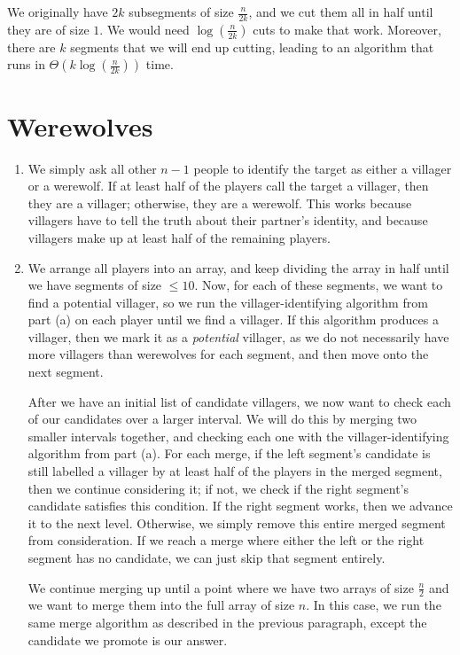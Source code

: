 \documentclass{article}
\begin{document}
We originally have $2k$ subsegments of size $\frac{n}{2k}$, and we cut them all in half until they are of size $1$. We would need $\log \left(\frac{n}{2k}\right)$ cuts to make that work. Moreover, there are $k$ segments that we will end up cutting, leading to an algorithm that runs in $\Theta\left(k \log \left(\frac{n}{2k}\right)\right)$ time.

\newpage
\section{Werewolves}
\begin{enumerate}[label=\alph*)]
	\item We simply ask all other $n-1$ people to identify the target as either a villager or a werewolf. If at least half of the players call the target a villager, then they are a villager; otherwise, they are a werewolf. This works because villagers have to tell the truth about their partner's identity, and because villagers make up at least half of the remaining players.
	\item We arrange all players into an array, and keep dividing the array in half until we have segments of size $\leq 10$. Now, for each of these segments, we want to find a potential villager, so we run the villager-identifying algorithm from part (a) on each player until we find a villager. If this algorithm produces a villager, then we mark it as a \textit{potential} villager, as we do not necessarily have more villagers than werewolves for each segment, and then move onto the next segment.

	After we have an initial list of candidate villagers, we now want to check each of our candidates over a larger interval. We will do this by merging two smaller intervals together, and checking each one with the villager-identifying algorithm from part (a). For each merge, if the left segment's candidate is still labelled a villager by at least half of the players in the merged segment, then we continue considering it; if not, we check if the right segment's candidate satisfies this condition. If the right segment works, then we advance it to the next level. Otherwise, we simply remove this entire merged segment from consideration. If we reach a merge where either the left or the right segment has no candidate, we can just skip that segment entirely.

	We continue merging up until a point where we have two arrays of size $\frac{n}{2}$ and we want to merge them into the full array of size $n$. In this case, we run the same merge algorithm as described in the previous paragraph, except the candidate we promote is our answer.


\end{enumerate}
\end{document}
